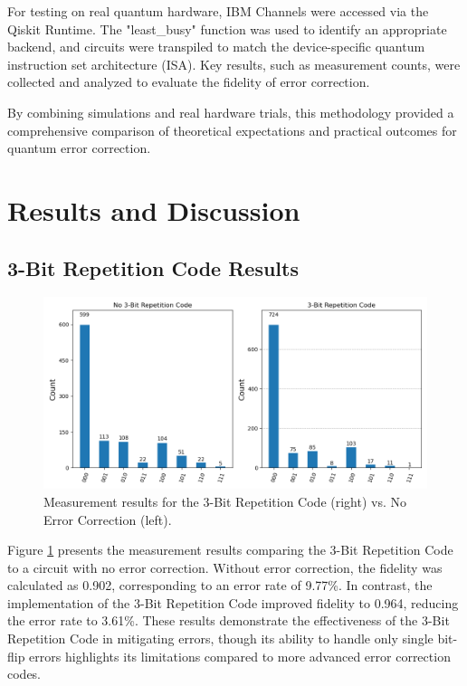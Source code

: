 \documentclass[10pt]{article}
\begin{document}
\begin{multicols}{2}
For testing on real quantum hardware, IBM Channels were accessed via the Qiskit Runtime. The "least\_busy" function was used to identify an appropriate backend, and circuits were transpiled to match the device-specific quantum instruction set architecture (ISA). Key results, such as measurement counts, were collected and analyzed to evaluate the fidelity of error correction.\cite{qiskit}

By combining simulations and real hardware trials, this methodology provided a comprehensive comparison of theoretical expectations and practical outcomes for quantum error correction.

\section*{Results and Discussion}
\subsection*{3-Bit Repetition Code Results}
\begin{figure}[H]
    \centering
    \includegraphics[width=1.0\columnwidth]{figures/3-bit_results.png}
    \caption{Measurement results for the 3-Bit Repetition Code (right) vs. No Error Correction (left).}
    \label{fig:3_bit_results}
\end{figure}

Figure \ref{fig:3_bit_results} presents the measurement results comparing the 3-Bit Repetition Code to a circuit with no error correction. Without error correction, the fidelity was calculated as 0.902, corresponding to an error rate of 9.77\%. In contrast, the implementation of the 3-Bit Repetition Code improved fidelity to 0.964, reducing the error rate to 3.61\%. These results demonstrate the effectiveness of the 3-Bit Repetition Code in mitigating errors, though its ability to handle only single bit-flip errors highlights its limitations compared to more advanced error correction codes.


\end{multicols}
\end{document}
